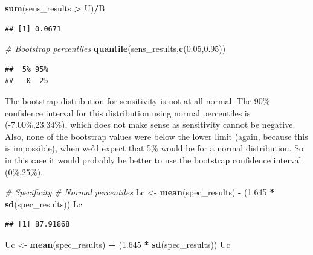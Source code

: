 \documentclass[]{article}
\newenvironment{Shaded}{\begin{snugshade}}{\end{snugshade}}
\newcommand{\CommentTok}[1]{\textcolor[rgb]{0.56,0.35,0.01}{\textit{#1}}}
\newcommand{\FloatTok}[1]{\textcolor[rgb]{0.00,0.00,0.81}{#1}}
\newcommand{\KeywordTok}[1]{\textcolor[rgb]{0.13,0.29,0.53}{\textbf{#1}}}
\newcommand{\NormalTok}[1]{#1}
\newcommand{\OperatorTok}[1]{\textcolor[rgb]{0.81,0.36,0.00}{\textbf{#1}}}
\newcommand{\StringTok}[1]{\textcolor[rgb]{0.31,0.60,0.02}{#1}}
\begin{document}
\begin{Shaded}
\begin{Highlighting}[]
\KeywordTok{sum}\NormalTok{(sens_results }\OperatorTok{>}\StringTok{ }\NormalTok{U)}\OperatorTok{/}\NormalTok{B}
\end{Highlighting}
\end{Shaded}

\begin{verbatim}
## [1] 0.0671
\end{verbatim}

\begin{Shaded}
\begin{Highlighting}[]
\CommentTok{# Bootstrap percentiles}
\KeywordTok{quantile}\NormalTok{(sens_results,}\KeywordTok{c}\NormalTok{(}\FloatTok{0.05}\NormalTok{,}\FloatTok{0.95}\NormalTok{))}
\end{Highlighting}
\end{Shaded}

\begin{verbatim}
##  5% 95% 
##   0  25
\end{verbatim}

The bootstrap distribution for sensitivity is not at all normal. The
90\% confidence interval for this distribution using normal percentiles
is (-7.00\%,23.34\%), which does not make sense as sensitivity cannot be
negative. Also, none of the bootstrap values were below the lower limit
(again, because this is impossible), when we'd expect that 5\% would be
for a normal distribution. So in this case it would probably be better
to use the bootstrap confidence interval (0\%,25\%).

\begin{Shaded}
\begin{Highlighting}[]
\CommentTok{# Specificity}
\CommentTok{# Normal percentiles}
\NormalTok{Lc <-}\StringTok{ }\KeywordTok{mean}\NormalTok{(spec_results) }\OperatorTok{-}\StringTok{ }\NormalTok{(}\FloatTok{1.645} \OperatorTok{*}\StringTok{ }\KeywordTok{sd}\NormalTok{(spec_results))}
\NormalTok{Lc}
\end{Highlighting}
\end{Shaded}

\begin{verbatim}
## [1] 87.91868
\end{verbatim}

\begin{Shaded}
\begin{Highlighting}[]
\NormalTok{Uc <-}\StringTok{ }\KeywordTok{mean}\NormalTok{(spec_results) }\OperatorTok{+}\StringTok{ }\NormalTok{(}\FloatTok{1.645} \OperatorTok{*}\StringTok{ }\KeywordTok{sd}\NormalTok{(spec_results))}
\NormalTok{Uc}
\end{Highlighting}
\end{Shaded}
\end{document}
